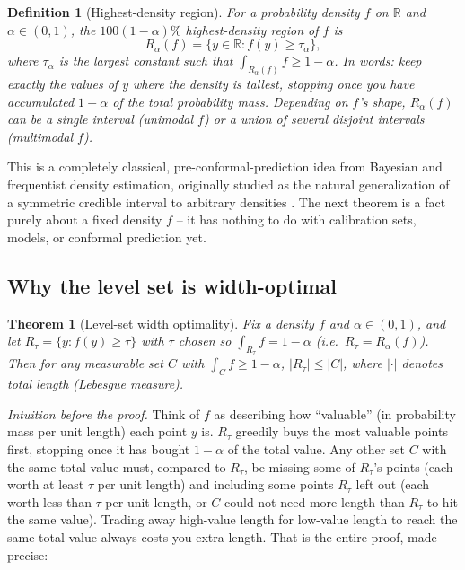 \documentclass[11pt]{article}
\newtheorem{definition}{Definition}[section]
\newtheorem{theorem}{Theorem}[section]
\begin{document}
\begin{definition}[Highest-density region]
\label{def:hpd}
For a probability density $f$ on $\mathbb R$ and $\alpha\in(0,1)$, the $100(1-\alpha)\%$
\emph{highest-density region} of $f$ is
\begin{equation}
R_\alpha(f) = \{y \in \mathbb R : f(y) \ge \tau_\alpha\},
\end{equation}
where $\tau_\alpha$ is the largest constant such that $\int_{R_\alpha(f)} f \ge 1-\alpha$. In
words: keep exactly the values of $y$ where the density is \emph{tallest}, stopping once you have
accumulated $1-\alpha$ of the total probability mass. Depending on $f$'s shape, $R_\alpha(f)$ can
be a single interval (unimodal $f$) or a union of several disjoint intervals (multimodal $f$).
\end{definition}

This is a completely classical, pre-conformal-prediction idea from Bayesian and frequentist
density estimation, originally studied as the natural generalization of a symmetric credible
interval to arbitrary densities \cite{boxtiao1973bayesian,hyndman1996computing}. The next theorem
is a fact purely about a fixed density $f$ -- it has nothing to do with calibration sets, models,
or conformal prediction yet.

\subsection{Why the level set is width-optimal}

\begin{theorem}[Level-set width optimality]
\label{thm:hpd}
Fix a density $f$ and $\alpha\in(0,1)$, and let $R_\tau=\{y:f(y)\ge\tau\}$ with $\tau$ chosen so
$\int_{R_\tau}f=1-\alpha$ (i.e.\ $R_\tau=R_\alpha(f)$). Then for \emph{any} measurable set $C$
with $\int_C f \ge 1-\alpha$, $|R_\tau| \le |C|$, where $|\cdot|$ denotes total length (Lebesgue
measure).
\end{theorem}

\emph{Intuition before the proof.} Think of $f$ as describing how ``valuable'' (in probability
mass per unit length) each point $y$ is. $R_\tau$ greedily buys the most valuable points first,
stopping once it has bought $1-\alpha$ of the total value. Any other set $C$ with the same total
value must, compared to $R_\tau$, be missing some of $R_\tau$'s points (each worth at least
$\tau$ per unit length) and including some points $R_\tau$ left out (each worth less than $\tau$
per unit length, or $C$ could not need more length than $R_\tau$ to hit the same value). Trading
away high-value length for low-value length to reach the same total value always costs you extra
length. That is the entire proof, made precise:
\end{document}
